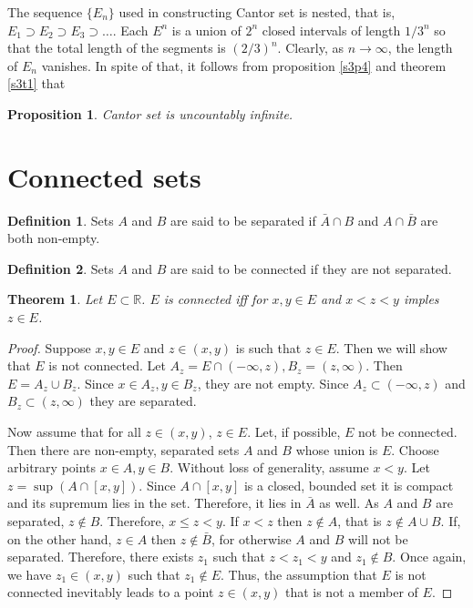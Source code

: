 \documentclass{article}
\theoremstyle{plain}
\newtheorem{thm}{Theorem}
\numberwithin{thm}{section}
\theoremstyle{plain}
\newtheorem{prop}{Proposition}
\numberwithin{prop}{section}
\theoremstyle{definition}
\newtheorem{defn}{Definition}
\numberwithin{defn}{section}
\theoremstyle{remark}
\numberwithin{equation}{section}
\begin{document}
The sequence $\{E_n\}$ used in constructing Cantor set is nested, that is, 
$E_1 \supset E_2 \supset E_3 \supset \ldots$. Each $E^n$ is a union of $2^n$ 
closed intervals of length $1/3^n$ so that the total length of the segments is 
$(2/3)^n$. Clearly, as $n \rightarrow \infty$, the length of $E_n$ vanishes. 
In spite of that, it follows from proposition \ref{s3p4} and theorem \ref{s3t1}
that
\begin{prop}\label{s3p5}
Cantor set is uncountably infinite.
\end{prop}

\section{Connected sets}\label{s4}
\begin{defn}\label{s4d1}
Sets $A$ and $B$ are said to be separated if $\bar{A} \cap B$ and $A \cap 
\bar{B}$ are both non-empty.
\end{defn}

\begin{defn}\label{s4d2}
Sets $A$ and $B$ are said to be connected if they are not separated.
\end{defn}

\begin{thm}\label{s4t1}
Let $E \subset \mathbb{R}$. $E$ is connected iff for $x, y \in E$ and $x < z
< y$ imples $z \in E$.
\end{thm}
\begin{proof}
Suppose $x, y \in E$ and $z \in (x, y)$ is such that $z \in E$. Then we will 
show that $E$ is not connected. Let $A_z = E \cap (-\infty, z), B_z = (z, 
\infty)$. Then $E = A_z \cup B_z$. Since $x \in A_z, y \in B_z$, they are not
empty. Since $A_z \subset (-\infty, z)$ and $B_z \subset (z, \infty)$ they are
separated.

Now assume that for all $z \in (x, y)$, $z \in E$. Let, if possible, $E$ not 
be  connected. Then there are non-empty, separated sets $A$ and $B$ whose union
is $E$. Choose arbitrary points $x \in A, y \in B$. Without loss of generality,
assume $x < y$. Let $z = \sup (A \cap [x, y])$. Since $A \cap [x, y]$ is a 
closed, bounded set it is compact and its supremum lies in the set. Therefore,
it lies in $\bar{A}$ as well. As $A$ and $B$ are separated, $z \notin B$. 
Therefore, $x \le z < y$. If $x < z$ then $z \notin A$, that is $z \notin
A \cup B$. If, on the other hand, $z \in A$ then $z \notin \bar{B}$, for 
otherwise $A$ and $B$ will not be separated. Therefore, there exists $z_1$ such
that $z < z_1 < y$ and $z_1 \notin B$. Once again, we have $z_1 \in (x, y)$
such that $z_1 \notin E$. Thus, the assumption that $E$ is not connected
inevitably leads to a point $z \in (x, y)$ that is not a member of $E$. 
\end{proof}
\end{document}

